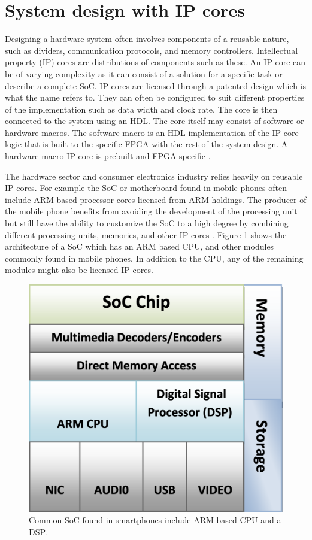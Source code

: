 \documentclass[12pt]{report}
\begin{document}
\section{System design with IP cores}
Designing a hardware system often involves components of a reusable nature, such as dividers, communication protocols, and memory controllers. Intellectual property (IP) cores are distributions of components such as these. An IP core can be of varying complexity as it can consist of a solution for a specific task or describe a complete SoC. IP cores are licensed through a patented design which is what the name refers to. They can often be configured to suit different properties of the implementation such as data width and clock rate. The core is then connected to the system using an HDL. The core itself may consist of software or hardware macros. The software macro is an HDL implementation of the IP core logic that is built to the specific FPGA with the rest of the system design. A hardware macro IP core is prebuilt and FPGA specific \citep{EERefBook} \citep{XilVivado}.
\par
The hardware sector and consumer electronics industry relies heavily on reusable IP cores. For example the SoC or motherboard found in mobile phones often include ARM based processor cores licensed from ARM holdings. The producer of the mobile phone benefits from avoiding the development of the processing unit but still have the ability to customize the SoC to a high degree by combining different processing units, memories, and other IP cores \citep{ArmInMobile} \citep{HarvIPCore}. Figure \ref{fig:6} shows the architecture of a SoC which has an ARM based CPU, and other modules commonly found in mobile phones. In addition to the CPU, any of the remaining modules might also be licensed IP cores.

\begin{figure}[h]
    \centering
    \includegraphics[scale=0.25]{figures/arm_soc.png}
    \caption{Common SoC found in smartphones include ARM based CPU and a DSP. \citep{ArmInMobile}}
    \label{fig:6}
\end{figure}
\end{document}
